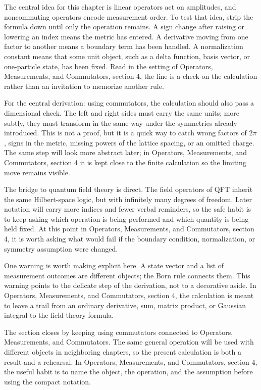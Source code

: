The central idea for this chapter is linear operators act on amplitudes, and noncommuting operators encode measurement order.  To test that idea, strip the formula down until only the operation remains.  A sign change after raising or lowering an index means the metric has entered.  A derivative moving from one factor to another means a boundary term has been handled.  A normalization constant means that some unit object, such as a delta function, basis vector, or one-particle state, has been fixed.  Read in the setting of Operators, Measurements, and Commutators, section 4, the line is a check on the calculation rather than an invitation to memorize another rule.

For the central derivation: using commutators, the calculation should also pass a dimensional check.  The left and right sides must carry the same units; more subtly, they must transform in the same way under the symmetries already introduced.  This is not a proof, but it is a quick way to catch wrong factors of \(2\pi\), signs in the metric, missing powers of the lattice spacing, or an omitted charge.  The same step will look more abstract later; in Operators, Measurements, and Commutators, section 4 it is kept close to the finite calculation so the limiting move remains visible.

The bridge to quantum field theory is direct.  The field operators of QFT inherit the same Hilbert-space logic, but with infinitely many degrees of freedom.  Later notation will carry more indices and fewer verbal reminders, so the safe habit is to keep asking which operation is being performed and which quantity is being held fixed.  At this point in Operators, Measurements, and Commutators, section 4, it is worth asking what would fail if the boundary condition, normalization, or symmetry assumption were changed.

One warning is worth making explicit here.  A state vector and a list of measurement outcomes are different objects; the Born rule connects them.  This warning points to the delicate step of the derivation, not to a decorative aside.  In Operators, Measurements, and Commutators, section 4, the calculation is meant to leave a trail from an ordinary derivative, sum, matrix product, or Gaussian integral to the field-theory formula.

The section closes by keeping using commutators connected to Operators, Measurements, and Commutators.  The same general operation will be used with different objects in neighboring chapters, so the present calculation is both a result and a rehearsal.  In Operators, Measurements, and Commutators, section 4, the useful habit is to name the object, the operation, and the assumption before using the compact notation.



